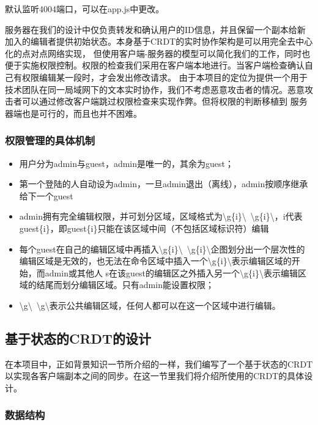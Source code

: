 \documentclass[11pt]{ctexart}
\begin{document}
默认监听4004端口，可以在\textsf{app.js}中更改。

服务器在我们的设计中仅负责转发和确认用户的ID信息，并且保留一个副本给新加入的编辑者提供初始状态。本身基于CRDT的实时协作架构是可以用完全去中心化的点对点网络实现，
但使用客户端-服务器的模型可以简化我们的工作，同时也便于实施权限控制。权限的检查我们采用在客户端本地进行。当客户端检查确认自己有权限编辑某一段时，才会发出修改请求。
由于本项目的定位为提供一个用于技术团队在同一局域网下的文本实时协作，我们不考虑恶意攻击者的情况。恶意攻击者可以通过修改客户端跳过权限检查来实现作弊。但将权限的判断移植到
服务器端也是可行的，而且也并不困难。

\subsubsection{权限管理的具体机制}
\begin{itemize}
    \item 用户分为admin与guest，admin是唯一的，其余为guest；
    \item 第一个登陆的人自动设为admin，一旦admin退出（离线），admin按顺序继承给下一个guest
    \item admin拥有完全编辑权限，并可划分区域，区域格式为\textsf{\textbackslash g\{i\}\textbackslash \ \textbackslash g\{i\}\textbackslash}，i代表guest\{i\}，即guest\{i\}只能在该区域中间（不包括区域标识符）编辑
    \item 每个guest在自己的编辑区域中再插入\textsf{\textbackslash g\{i\}\textbackslash \ \textbackslash g\{i\}\textbackslash}企图划分出一个层次性的编辑区域是无效的，也无法在命令区域中插入一个\textsf{\textbackslash g\{i\}\textbackslash}表示编辑区域的开始，而admin或其他人
    s在该guest的编辑区之外插入另一个\textsf{\textbackslash g\{i\}\textbackslash}表示编辑区域的结尾而划分编辑区域。只有admin能设置权限；
    \item \textsf{\textbackslash g\textbackslash \  \textbackslash g\textbackslash}表示公共编辑区域，任何人都可以在这一个区域中进行编辑。
\end{itemize}

\subsection{基于状态的CRDT的设计}
在本项目中，正如背景知识一节所介绍的一样，我们编写了一个基于状态的CRDT以实现各客户端副本之间的同步。在这一节里我们将介绍所使用的CRDT的具体设计。
\subsubsection{数据结构}
\end{document}
